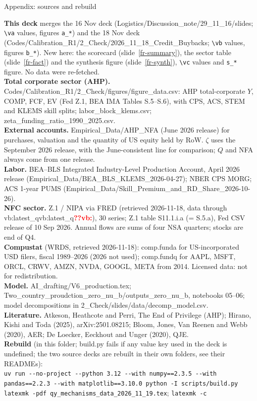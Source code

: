 \documentclass[aspectratio=169,10pt,t]{beamer}
\newcommand{\vget}[2]{\ifcsname #1:#2\endcsname\csname #1:#2\endcsname\else\textcolor{red}{\textbf{??#1:\detokenize{#2}}}\fi}
\newcommand{\vb}[1]{\vget{vb}{#1}}%
\newcommand{\slref}[1]{slide~\ref{#1}}
\begin{document}
\begin{frame}[label=fr-sources]{Appendix: sources and rebuild}
\vspace{0.05cm}
{\tiny
\textbf{This deck} merges the 16 Nov deck (Logistics/Discussion\_note/29\_11\_16/slides; \texttt{\textbackslash va} values, figures \texttt{a\_*}) and the 18 Nov deck (Codes/Calibration\_R1/2\_Check/2026\_11\_18\_Credit\_Buybacks; \texttt{\textbackslash vb} values, figures \texttt{b\_*}). New here: the scorecard (\slref{fr-summary}), the sector table (\slref{fr-fact}) and the synthesis figure (\slref{fr-synth}), \texttt{\textbackslash vc} values and \texttt{s\_*} figure. No data were re-fetched.\\[0.1cm]
\textbf{Total corporate sector (AHP).} Codes/Calibration\_R1/2\_Check/figures/figure\_data.csv: AHP total-corporate $Y$, COMP, FCF, EV (Fed Z.1, BEA IMA Tables S.5--S.6), with CPS, ACS, STEM and KLEMS skill splits; labor\_block\_klems.csv; zeta\_funding\_ratio\_1990\_2025.csv.\\[0.1cm]
\textbf{External accounts.} Empirical\_Data/AHP\_NFA (June 2026 release) for purchases, valuation and the quantity of US equity held by RoW. $\zeta$ uses the September 2026 release, with the June-consistent line for comparison; $Q$ and NFA always come from one release.\\[0.1cm]
\textbf{Labor.} BEA--BLS Integrated Industry-Level Production Account, April 2026 release (Empirical\_Data/BEA\_BLS\_KLEMS\_2026-04-27); NBER CPS MORG; ACS 1-year PUMS (Empirical\_Data/Skill\_Premium\_and\_RD\_Share\_2026-10-26).\\[0.1cm]
\textbf{NFC sector.} Z.1 / NIPA via FRED (retrieved 2026-11-18, data through \vb{latest_q}), 30 series; Z.1 table S11.1.i.a (= S.5.a), Fed CSV release of 10 Sep 2026. Annual flows are sums of four NSA quarters; stocks are end of Q4.\\[0.1cm]
\textbf{Compustat} (WRDS, retrieved 2026-11-18): comp.funda for US-incorporated USD filers, fiscal 1989--2026 (2026 not used); comp.fundq for AAPL, MSFT, ORCL, CRWV, AMZN, NVDA, GOOGL, META from 2014. Licensed data: not for redistribution.\\[0.1cm]
\textbf{Model.} AI\_drafting/V6\_production.tex; Two\_country\_proudction\_zero\_nu\_b/outputs\_zero\_nu\_b, notebooks 05--06; model decompositions in 2\_Check/slides/data/decomp\_model.csv.\\[0.1cm]
\textbf{Literature.} Atkeson, Heathcote and Perri, The End of Privilege (AHP); Hirano, Kishi and Toda (2025), arXiv:2501.08215; Bloom, Jones, Van Reenen and Webb (2020), AER; De Loecker, Eeckhout and Unger (2020), QJE.\\[0.1cm]
\textbf{Rebuild} (in this folder; build.py fails if any value key used in the deck is undefined; the two source decks are rebuilt in their own folders, see their READMEs):\\
\texttt{uv run -{}-no-project -{}-python 3.12 -{}-with numpy==2.3.5 -{}-with pandas==2.2.3 -{}-with matplotlib==3.10.0 python -I scripts/build.py}\newline
\texttt{latexmk -pdf qy\_mechanisms\_data\_2026\_11\_19.tex}; \texttt{latexmk -c}\par}
\end{frame}
\end{document}

